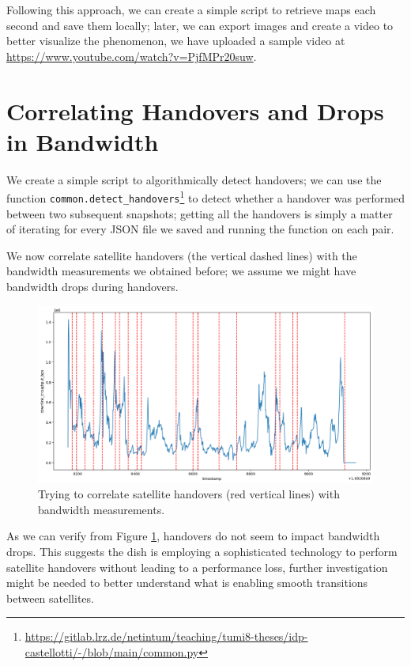\documentclass[IN,11pt,twoside,openright,idp,english]{tumthesis}
\begin{document}
Following this approach, we can create a simple script to retrieve maps each second and save them locally; later, we can
export images and create a video to better visualize the phenomenon, we have uploaded a sample video at
\url{https://www.youtube.com/watch?v=PjfMPr20suw}.

\section{Correlating Handovers and Drops in Bandwidth}
\label{sec:sat-hand-drop}

We create a simple script to algorithmically detect handovers; we can use the function
\texttt{common.detect\_handovers}\footnote{\url{https://gitlab.lrz.de/netintum/teaching/tumi8-theses/idp-castellotti/-/blob/main/common.py}}
to detect whether a handover was performed between two subsequent snapshots; getting all the handovers is simply a
matter of iterating for every JSON file we saved and running the function on each pair.

We now correlate satellite handovers (the vertical dashed lines) with the bandwidth measurements we obtained before; we
assume we might have bandwidth drops during handovers. 

\begin{figure}
    \centering
    \includegraphics[width=1\columnwidth]{img/correlation_handovers_bw.png}
    \caption{Trying to correlate satellite handovers (red vertical lines) with bandwidth measurements.}
    \label{fig:vis-correlation-handovers}
\end{figure}

As we can verify from Figure \ref{fig:vis-correlation-handovers}, handovers do not seem to impact bandwidth drops. This
suggests the dish is employing a sophisticated technology to perform satellite handovers without leading to a
performance loss, further investigation might be needed to better understand what is enabling smooth transitions between
satellites.
\end{document}
